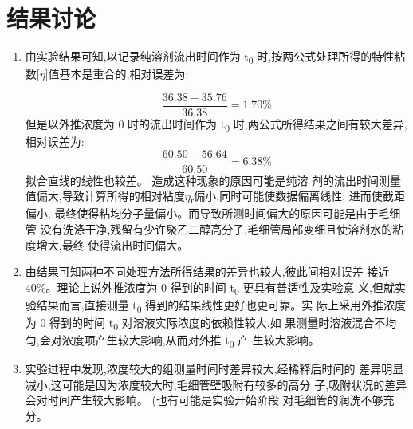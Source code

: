 \documentclass[11pt]{report}
\begin{document}
\section{结果讨论}
\label{sec:org4ec960b}
\begin{enumerate}
\item 
\label{sec:org2ba9fe8}
由实验结果可知,以记录纯溶剂流出时间作为 t\textsubscript{0} 时,按两公式处理所得的特性粘数[\(\eta\)]值基本是重合的,相对误差为:

\[
\frac{36.38-35.76}{36.38}=1.70\%
\]
但是以外推浓度为 0 时的流出时间作为 t\textsubscript{0} 时,两公式所得结果之间有较大差异,相对误差为:
\[
\frac{60.50-56.64}{60.50}=6.38\%
\]
拟合直线的线性也较差。
造成这种现象的原因可能是纯溶
剂的流出时间测量值偏大,导致计算所得的相对粘度\(\eta\)\textsubscript{r}偏小,同时可能使数据偏离线性,
进而使截距偏小, 最终使得粘均分子量偏小。而导致所测时间偏大的原因可能是由于毛细管
没有洗涤干净,残留有少许聚乙二醇高分子,毛细管局部变细且使溶剂水的粘度增大,最终
使得流出时间偏大。

\item 
\label{sec:org50084b6}
由结果可知两种不同处理方法所得结果的差异也较大,彼此间相对误差
接近 40\%。理论上说外推浓度为 0 得到的时间 t\textsubscript{0} 更具有普适性及实验意
义,但就实验结果而言,直接测量 t\textsubscript{0} 得到的结果线性更好也更可靠。实
际上采用外推浓度为 0 得到的时间 t\textsubscript{0} 对溶液实际浓度的依赖性较大,如
果测量时溶液混合不均匀,会对浓度项产生较大影响,从而对外推 t\textsubscript{0} 产
生较大影响。

\item 
\label{sec:org9193b5b}
实验过程中发现,浓度较大的组测量时间时差异较大,经稀释后时间的
差异明显减小,这可能是因为浓度较大时,毛细管壁吸附有较多的高分
子,吸附状况的差异会对时间产生较大影响。 (也有可能是实验开始阶段
对毛细管的润洗不够充分。
\end{enumerate}
\end{document}
